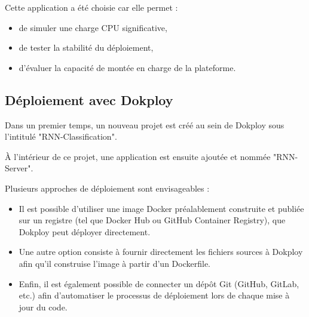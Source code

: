 \documentclass{rapportClass} %
\begin{document}

\smallskip
Cette application a été choisie car elle permet :
\begin{itemize}
\item de simuler une charge CPU significative,
\item de tester la stabilité du déploiement,
\item d'évaluer la capacité de montée en charge de la plateforme.
\end{itemize}



\subsection{Déploiement avec Dokploy}

Dans un premier temps, un nouveau projet est créé au sein de Dokploy
sous l'intitulé "RNN-Classification".

\smallskip
À l'intérieur de ce projet, une application est ensuite ajoutée et
nommée "RNN-Server".


\smallskip
Plusieurs approches de déploiement sont envisageables :
\begin{itemize}[label=$\bullet$] 
\item Il est possible d'utiliser une image Docker préalablement
  construite et publiée sur un registre (tel que Docker Hub ou GitHub
  Container Registry), que Dokploy peut déployer directement.

\item Une autre option consiste à fournir directement les fichiers
  sources à Dokploy afin qu'il construise l'image à partir d'un
  Dockerfile.

\item Enfin, il est également possible de connecter un dépôt Git
  (GitHub, GitLab, etc.) afin d'automatiser le processus de
  déploiement lors de chaque mise à jour du code.
\end{itemize}
\end{document}
